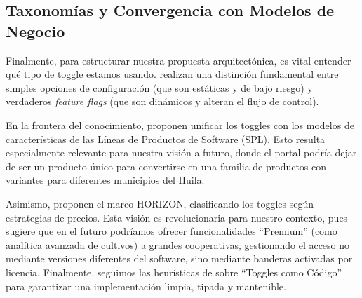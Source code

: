 \subsection{Taxonomías y Convergencia con Modelos de Negocio}

Finalmente, para estructurar nuestra propuesta arquitectónica, es vital entender qué tipo de toggle estamos usando. \cite{torres2020differences} realizan una distinción fundamental entre simples opciones de configuración (que son estáticas y de bajo riesgo) y verdaderos \textit{feature flags} (que son dinámicos y alteran el flujo de control).

En la frontera del conocimiento, \cite{dupont2022unifying} proponen unificar los toggles con los modelos de características de las Líneas de Productos de Software (SPL). Esto resulta especialmente relevante para nuestra visión a futuro, donde el portal podría dejar de ser un producto único para convertirse en una familia de productos con variantes para diferentes municipios del Huila.

Asimismo, \cite{chen2025horizon} proponen el marco HORIZON, clasificando los toggles según estrategias de precios. Esta visión es revolucionaria para nuestro contexto, pues sugiere que en el futuro podríamos ofrecer funcionalidades ``Premium'' (como analítica avanzada de cultivos) a grandes cooperativas, gestionando el acceso no mediante versiones diferentes del software, sino mediante banderas activadas por licencia. Finalmente, seguimos las heurísticas de \cite{ajmeri2022heuristics} sobre ``Toggles como Código'' para garantizar una implementación limpia, tipada y mantenible.


